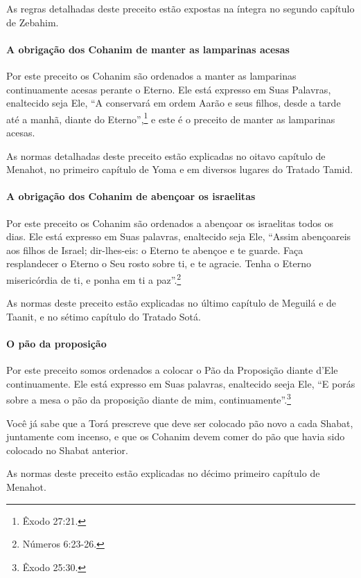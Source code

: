 As regras detalhadas deste preceito estão expostas na íntegra no segundo
capítulo de Zebahim.

\paragraph{A obrigação dos Cohanim de manter as lamparinas acesas}

Por este preceito os Cohanim são ordenados a manter as lamparinas
continuamente acesas perante o Eterno. Ele está expresso em Suas
Palavras, enaltecido seja Ele, ``A conservará em ordem Aarão e seus
filhos, desde a tarde até a manhã, diante do Eterno'',\footnote{Êxodo 27:21.} e
este é o preceito de manter as lamparinas acesas.

As normas detalhadas deste preceito estão explicadas no oitavo capítulo
de Menahot, no primeiro capítulo de Yoma e em diversos lugares do
Tratado Tamid.

\paragraph{A obrigação dos Cohanim de abençoar os israelitas}

Por este preceito os Cohanim são ordenados a abençoar os israelitas
todos os dias. Ele está expresso em Suas palavras, enaltecido seja Ele,
``Assim abençoareis aos filhos de Israel; dir-lhes-eis: o Eterno te
abençoe e te guarde. Faça resplandecer o Eterno o Seu rosto sobre ti, e
te agracie. Tenha o Eterno misericórdia de ti, e ponha em ti a paz''.\footnote{Números 6:23-26.}

As normas deste preceito estão explicadas no último capítulo de Meguilá
e de Taanit, e no sétimo capítulo do Tratado Sotá.

\paragraph{O pão da proposição}

Por este preceito somos ordenados a colocar o Pão da Proposição diante
d'Ele continuamente. Ele está expresso em Suas palavras, enaltecido
seeja Ele, ``E porás sobre a mesa o pão da proposição diante de mim,
continuamente''.\footnote{Êxodo 25:30.}

Você já sabe que a Torá prescreve que deve ser colocado pão novo a cada Shabat, juntamente com incenso, e que os Cohanim devem
comer do pão que havia sido colocado no Shabat anterior.

As normas deste preceito estão explicadas no décimo primeiro capítulo
de Menahot.

